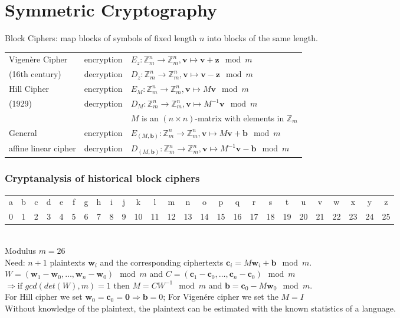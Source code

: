 \section{Symmetric Cryptography}
Block Ciphers: map blocks of symbols of fixed length $n$ into blocks of the same length.\\
\begin{tabular}{|l l |l|}
	\hline
	Vigenère Cipher &	encryption	&	$E_z: \mathbb{Z}_m^n \to \mathbb{Z}_m^n, \mathbf{v} \mapsto \mathbf{v} + \mathbf{z} \mod m$ \\
							         \cline{2-3}
	(16th century) & decryption & $D_z: \mathbb{Z}_m^n \to \mathbb{Z}_m^n, \mathbf{v} \mapsto \mathbf{v} - \mathbf{z} \mod m$ \\
	\hline
	Hill Cipher & encryption & $E_M: \mathbb{Z}_m^n \to \mathbb{Z}_m^n, \mathbf{v} \mapsto M\mathbf{v} \mod m$ \\
							         \cline{2-3}
	(1929) & decryption & $D_M: \mathbb{Z}_m^n \to \mathbb{Z}_m^n, \mathbf{v} \mapsto M^{-1}\mathbf{v} \mod m$ \\
	& & $M$ is an $(n \times n)$-matrix with elements in $\mathbb{Z}_m$ \\
	\hline
	General & encryption & $E_{(M,\mathbf{b})}: \mathbb{Z}_m^n \to \mathbb{Z}_m^n, \mathbf{v} \mapsto M\mathbf{v} + \mathbf{b} \mod m$ \\
							         \cline{2-3}
	affine linear cipher & decryption & $D_{(M,\mathbf{b})}: \mathbb{Z}_m^n \to \mathbb{Z}_m^n, \mathbf{v} \mapsto M^{-1}\mathbf{v} - \mathbf{b} \mod m$ \\
	\hline
\end{tabular}

\subsubsection{Cryptanalysis of historical block ciphers}
\begin{tabular}{|cccccccccccccccccccccccccc|} %
	\hline
	a & b & c & d & e & f & g & h & i & j & k  & l  & m  & n  & o  & p  & q  & r  & s  & t  & u  & v  & w  & x  & y  & z  \\
	0 & 1 & 2 & 3 & 4 & 5 & 6 & 7 & 8 & 9 & 10 & 11 & 12 & 13 & 14 & 15 & 16 & 17 & 18 & 19 & 20 & 21 & 22 & 23 & 24 & 25 \\
	\hline
\end{tabular}\\
Modulus $m=26$\\

Need: $n+1$ plaintexts $\bm w_i$ and the corresponding ciphertexts $\mathbf{c}_i= M\mathbf{w}_i+ \mathbf{b} \mod m$.\\
$W=(\bm w_1-\bm w_0, \ldots , \bm w_n-\bm w_0)  \mod m$ and $C=(\bm c_1-\bm c_0, \ldots , \bm c_n-\bm c_0) \mod m$ \\
$\Rightarrow \text{if } gcd(det(W),m)=1 \text{ then } M=CW^{-1} \mod m$ and $\bm b=\bm c_0-M\bm w_0 \mod m$.\\
For Hill cipher we set $\bm w_0=\bm c_0 = \bm 0 \Rightarrow \bm b=0$; For Vigen\'{e}re cipher we set the $M = I$\\
Without knowledge of the plaintext, the plaintext can be estimated with the known statistics of a language. 

